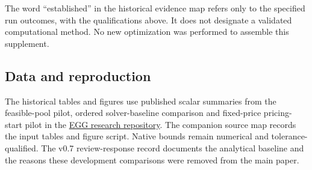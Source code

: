 \documentclass[11pt]{article}
\let\originalsubsection\subsection
\renewcommand{\subsection}{\FloatBarrier\originalsubsection}
\begin{document}
The word ``established'' in the historical evidence map refers only to the
specified run outcomes, with the qualifications above. It does not designate
a validated computational method. No new optimization was performed to
assemble this supplement.
\clearpage

\FloatBarrier
\subsection*{Data and reproduction}
The historical tables and figures use published scalar summaries from the
feasible-pool pilot, ordered solver-baseline comparison and fixed-price
pricing-start pilot in the \href{https://github.com/ndandnd/egg}{EGG research
repository}. The companion source map records the input tables and figure
script. Native bounds remain numerical and tolerance-qualified. The v0.7
review-response record documents the analytical baseline and the reasons
these development comparisons were removed from the main paper.
\end{document}
